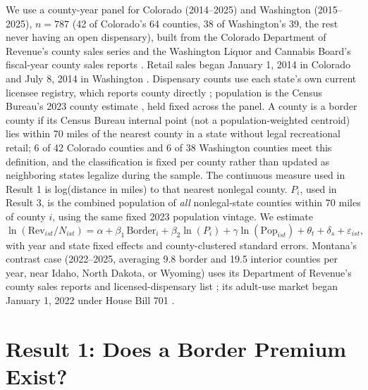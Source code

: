 \documentclass[5p]{elsarticle}
\begin{document}
We use a county-year panel for Colorado (2014--2025) and Washington (2015--2025), $n=787$ (42 of Colorado's
64 counties, 38 of Washington's 39, the rest never having an open dispensary), built from the Colorado
Department of Revenue's county sales series \citep{COMarijuanaSalesByCounty} and the Washington Liquor and
Cannabis Board's fiscal-year county sales reports \citep{WALCBSalesByCounty}. Retail sales began January 1,
2014 in Colorado \citep{COMedLicensees} and July 8, 2014 in Washington \citep{WSLCB2014FirstLicenses}.
Dispensary counts use each state's own current licensee registry, which reports county directly
\citep{COMedLicensees,WALCBLicenseeList,WALCBCannabisRetailers2026}; population is the Census Bureau's 2023
county estimate \citep{CensusPopEst2023}, held fixed across the panel. A county is a border county if its
Census Bureau internal point (not a population-weighted centroid) lies within 70 miles of the nearest county
in a state without legal recreational retail; 6 of 42 Colorado counties and 6 of 38 Washington counties meet
this definition, and the classification is fixed per county rather than updated as neighboring states
legalize during the sample. The continuous measure used in Result 1 is log(distance in miles) to that
nearest nonlegal county. $P_i$, used in Result 3, is the combined population of \emph{all} nonlegal-state
counties within 70 miles of county $i$, using the same fixed 2023 population vintage. We estimate
{\small
\begin{equation}
\ln\left(\text{Rev}_{ist}/N_{ist}\right) = \alpha + \beta_1\,\text{Border}_i + \beta_2\ln(P_i) + \gamma\ln(\text{Pop}_{ist}) + \theta_t + \delta_s + \varepsilon_{ist},
\end{equation}}
with year and state fixed effects and county-clustered standard errors. Montana's contrast case
(2022--2025, averaging 9.8 border and 19.5 interior counties per year, near Idaho, North Dakota, or Wyoming)
uses its Department of Revenue's county sales reports \citep{MTRevenueCountySales} and licensed-dispensary
list \citep{MTDispensaryLocations}; its adult-use market began January 1, 2022 under House Bill 701
\citep{MTHB701,MTRevenueCannabis}.

\section{Result 1: Does a Border Premium Exist?}
\end{document}
